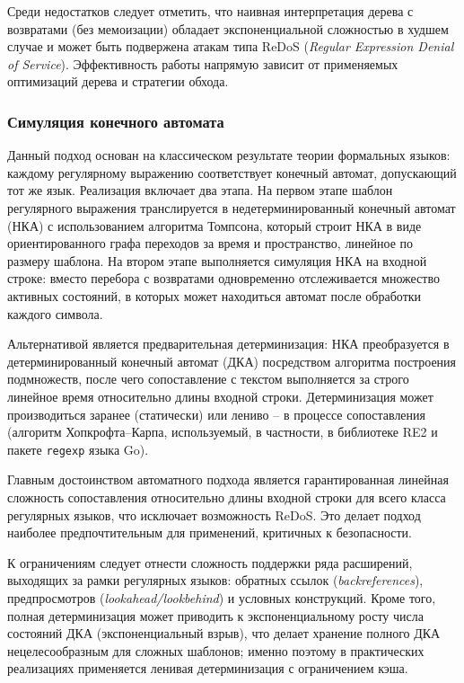 Среди недостатков следует отметить, что наивная интерпретация дерева с возвратами (без мемоизации) обладает экспоненциальной сложностью в худшем случае и может быть подвержена атакам типа ReDoS (\textit{Regular Expression Denial of Service}). Эффективность работы напрямую зависит от применяемых оптимизаций дерева и стратегии обхода.

\subsubsection{Симуляция конечного автомата}

Данный подход основан на классическом результате теории формальных языков: каждому регулярному выражению соответствует конечный автомат, допускающий тот же язык. Реализация включает два этапа. На первом этапе шаблон регулярного выражения транслируется в недетерминированный конечный автомат (НКА) с использованием алгоритма Томпсона, который строит НКА в виде ориентированного графа переходов за время и пространство, линейное по размеру шаблона. На втором этапе выполняется симуляция НКА на входной строке: вместо перебора с возвратами одновременно отслеживается множество активных состояний, в которых может находиться автомат после обработки каждого символа.

Альтернативой является предварительная детерминизация: НКА преобразуется в детерминированный конечный автомат (ДКА) посредством алгоритма построения подмножеств, после чего сопоставление с текстом выполняется за строго линейное время относительно длины входной строки. Детерминизация может производиться заранее (статически) или лениво -- в процессе сопоставления (алгоритм Хопкрофта--Карпа, используемый, в частности, в библиотеке RE2 и пакете \texttt{regexp} языка Go).

Главным достоинством автоматного подхода является гарантированная линейная сложность сопоставления относительно длины входной строки для всего класса регулярных языков, что исключает возможность ReDoS. Это делает подход наиболее предпочтительным для применений, критичных к безопасности.

К ограничениям следует отнести сложность поддержки ряда расширений, выходящих за рамки регулярных языков: обратных ссылок (\textit{backreferences}), предпросмотров (\textit{lookahead/lookbehind}) и условных конструкций. Кроме того, полная детерминизация может приводить к экспоненциальному росту числа состояний ДКА (экспоненциальный взрыв), что делает хранение полного ДКА нецелесообразным для сложных шаблонов; именно поэтому в практических реализациях применяется ленивая детерминизация с ограничением кэша.

